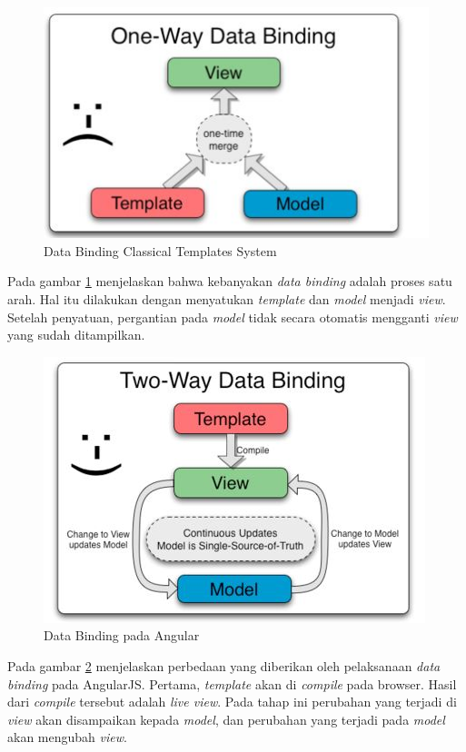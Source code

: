 	\begin{figure}[H]
		\centering
		\includegraphics[scale=0.75]{Gambar/Dabin1}
		\caption{Data Binding Classical Templates System}
		\label{fig:dabin1}
	\end{figure}
	Pada gambar \ref{fig:dabin1} menjelaskan bahwa kebanyakan \textit{data binding} adalah proses satu arah. Hal itu dilakukan dengan menyatukan \textit{template} dan \textit{model} menjadi \textit{view}. Setelah penyatuan, pergantian pada \textit{model} tidak secara otomatis mengganti \textit{view} yang sudah ditampilkan.
	\begin{figure}[H]
		\centering
		\includegraphics[scale=0.75]{Gambar/Dabin2}
		\caption{Data Binding pada Angular}
		\label{fig:dabin2}
	\end{figure}
	Pada gambar \ref{fig:dabin2} menjelaskan perbedaan yang diberikan oleh pelaksanaan \textit{data binding} pada AngularJS. Pertama, \textit{template} akan di \textit{compile} pada browser. Hasil dari \textit{compile} tersebut adalah \textit{live view}. Pada tahap ini perubahan yang terjadi di \textit{view} akan disampaikan kepada \textit{model}, dan perubahan yang terjadi pada \textit{model} akan mengubah \textit{view}.
	
